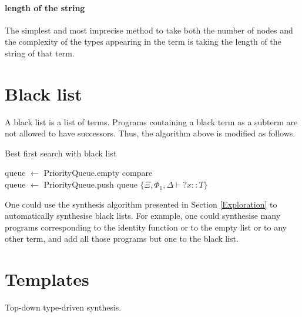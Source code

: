   \paragraph{length of the string}
The simplest and most imprecise method to take both the number of nodes and the complexity of the types appearing in the term is taking the length of the string of that term.

\section{Black list}\label{Black list}
A black list is a list of terms. Programs containing a black term as a subterm are not allowed to have successors. Thus, the algorithm above is modified as follows.

\begin{algorithm}
\caption{Best first search with black list}

queue $\gets$ PriorityQueue.empty compare\\
queue $\gets$ PriorityQueue.push queue $\{\Xi, \Phi_1, \Delta \vdash {?x} :: T\}$\\

\end{algorithm}

One could use the synthesis algorithm presented in Section \ref{Exploration} to automatically synthesise black lists. For example,  one could synthesise many programs corresponding to the identity function or to the empty list or to any other term, and add all those programs but one to the black list.

\section{Templates}\label{Templates}
  Top-down type-driven synthesis.

